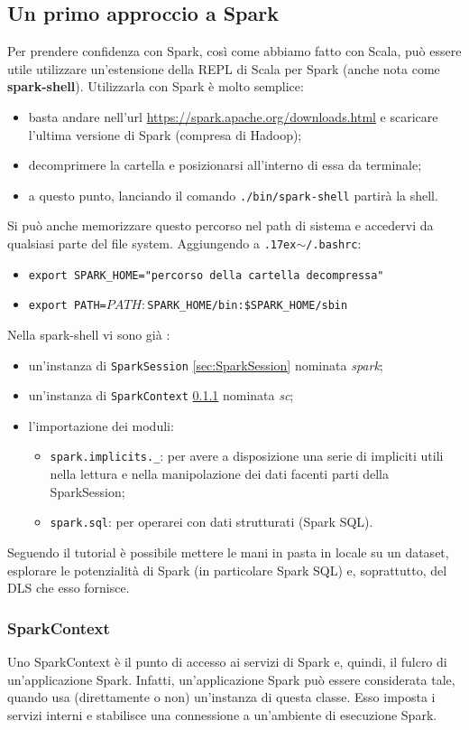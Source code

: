 \documentclass[12pt,italian]{article}
\begin{document}
\subsection{Un primo approccio a Spark}
Per prendere confidenza con Spark, così come abbiamo fatto con Scala, può essere utile utilizzare un'estensione della REPL di Scala per Spark (anche nota come \textbf{spark-shell}). 
Utilizzarla con Spark è molto semplice:
\begin{itemize}
	\item basta andare nell'url \url{https://spark.apache.org/downloads.html} e scaricare l'ultima versione di Spark (compresa di Hadoop);
	\item decomprimere la cartella e posizionarsi all'interno di essa da terminale;
	\item a questo punto, lanciando il comando \texttt{./bin/spark-shell} partirà la shell.
\end{itemize}
Si può anche memorizzare questo percorso nel path di sistema e accedervi da qualsiasi parte del file system. Aggiungendo a \texttt{{\raise.17ex\hbox{$\scriptstyle\sim$}}/.bashrc}:
\begin{itemize}
	\item \texttt{export SPARK\_HOME="percorso della cartella decompressa"} 
	\item \texttt{export PATH=$PATH:$SPARK\_HOME/bin:\$SPARK\_HOME/sbin}
\end{itemize}
Nella spark-shell vi sono già :
\begin{itemize}
	\item un'instanza di \texttt{SparkSession} \ref{sec:SparkSession} nominata \textit{spark};
	\item un'instanza di \texttt{SparkContext} \ref{sec:SparkContext} nominata \textit{sc};
	\item l'importazione dei moduli:
	\begin{itemize}
		\item \texttt{spark.implicits.\_}: per avere a disposizione una serie di impliciti utili nella lettura e nella manipolazione dei dati facenti parti della SparkSession;
		\item \texttt{spark.sql}: per operarei con dati strutturati (Spark SQL).
	\end{itemize}
\end{itemize}
Seguendo il tutorial \cite{localexample} è possibile mettere le mani in pasta in locale su un dataset, esplorare le potenzialità di Spark (in particolare Spark SQL) e, soprattutto, del DLS che esso fornisce.
\subsubsection{SparkContext}\label{sec:SparkContext} 
Uno SparkContext è il punto di accesso ai servizi di Spark e, quindi, il fulcro di un'applicazione Spark. Infatti, un'applicazione Spark può essere considerata tale, quando usa (direttamente o non) un'instanza di questa classe.
\newline
Esso imposta i servizi interni e stabilisce una connessione a un'ambiente di esecuzione Spark.
\end{document}
